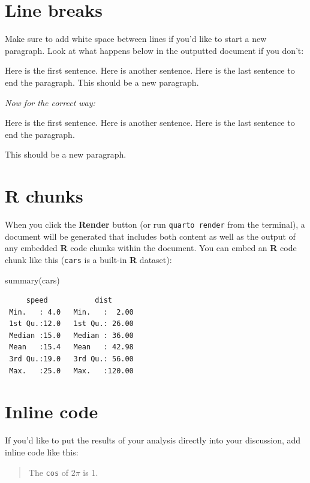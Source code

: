 \documentclass[
  letterpaper,
  12pt,
  twoside]{reedthesis}
\newenvironment{Shaded}{\begin{snugshade}}{\end{snugshade}}
\newcommand{\FunctionTok}[1]{\textcolor[rgb]{0.28,0.35,0.67}{#1}}
\newcommand{\NormalTok}[1]{\textcolor[rgb]{0.00,0.23,0.31}{#1}}
\begin{document}
\section{Line breaks}\label{line-breaks}

Make sure to add white space between lines if you'd like to start a new
paragraph. Look at what happens below in the outputted document if you
don't:

Here is the first sentence. Here is another sentence. Here is the last
sentence to end the paragraph. This should be a new paragraph.

\emph{Now for the correct way:}

Here is the first sentence. Here is another sentence. Here is the last
sentence to end the paragraph.

This should be a new paragraph.

\section{R chunks}\label{r-chunks}

When you click the \textbf{Render} button (or run
\texttt{quarto\ render} from the terminal), a document will be generated
that includes both content as well as the output of any embedded
\textbf{R} code chunks within the document. You can embed an \textbf{R}
code chunk like this (\texttt{cars} is a built-in \textbf{R} dataset):

\begin{Shaded}
\begin{Highlighting}[]
\FunctionTok{summary}\NormalTok{(cars)}
\end{Highlighting}
\end{Shaded}

\begin{verbatim}
     speed           dist       
 Min.   : 4.0   Min.   :  2.00  
 1st Qu.:12.0   1st Qu.: 26.00  
 Median :15.0   Median : 36.00  
 Mean   :15.4   Mean   : 42.98  
 3rd Qu.:19.0   3rd Qu.: 56.00  
 Max.   :25.0   Max.   :120.00  
\end{verbatim}

\section{Inline code}\label{inline-code}

If you'd like to put the results of your analysis directly into your
discussion, add inline code like this:

\begin{quote}
The \texttt{cos} of \(2 \pi\) is 1.
\end{quote}
\end{document}
